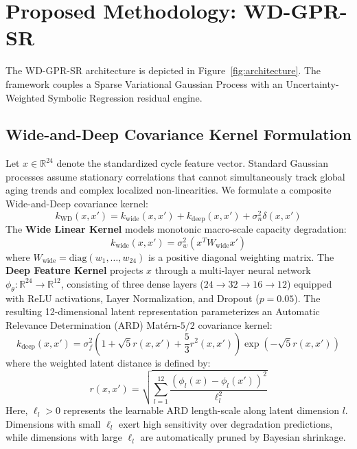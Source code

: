 \documentclass[a4paper,fleqn]{cas-sc}
\begin{document}
\section{Proposed Methodology: WD-GPR-SR}
The WD-GPR-SR architecture is depicted in Figure~\ref{fig:architecture}. The framework couples a Sparse Variational Gaussian Process with an Uncertainty-Weighted Symbolic Regression residual engine.

\subsection{Wide-and-Deep Covariance Kernel Formulation}
Let $x \in \mathbb{R}^{24}$ denote the standardized cycle feature vector. Standard Gaussian processes assume stationary correlations that cannot simultaneously track global aging trends and complex localized non-linearities. We formulate a composite Wide-and-Deep covariance kernel:
\begin{equation}
    k_{\text{WD}}(x, x') = k_{\text{wide}}(x, x') + k_{\text{deep}}(x, x') + \sigma_n^2 \delta(x, x')
\end{equation}
The \textbf{Wide Linear Kernel} models monotonic macro-scale capacity degradation:
\begin{equation}
    k_{\text{wide}}(x, x') = \sigma_w^2 \left( x^T W_{\text{wide}} x' \right)
\end{equation}
where $W_{\text{wide}} = \text{diag}(w_1, \dots, w_{24})$ is a positive diagonal weighting matrix. The \textbf{Deep Feature Kernel} projects $x$ through a multi-layer neural network $\phi_\theta : \mathbb{R}^{24} \to \mathbb{R}^{12}$, consisting of three dense layers ($24 \to 32 \to 16 \to 12$) equipped with ReLU activations, Layer Normalization, and Dropout ($p=0.05$). The resulting 12-dimensional latent representation parameterizes an Automatic Relevance Determination (ARD) Matérn-$5/2$ covariance kernel:
\begin{equation}
    k_{\text{deep}}(x, x') = \sigma_f^2 \left( 1 + \sqrt{5} r(x, x') + \frac{5}{3} r^2(x, x') \right) \exp\left( -\sqrt{5} r(x, x') \right)
\end{equation}
where the weighted latent distance is defined by:
\begin{equation}
    r(x, x') = \sqrt{ \sum_{l=1}^{12} \frac{(\phi_l(x) - \phi_l(x'))^2}{\ell_l^2} }
\end{equation}
Here, $\ell_l > 0$ represents the learnable ARD length-scale along latent dimension $l$. Dimensions with small $\ell_l$ exert high sensitivity over degradation predictions, while dimensions with large $\ell_l$ are automatically pruned by Bayesian shrinkage.
\end{document}
